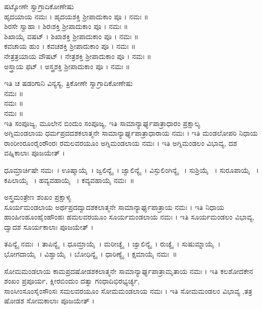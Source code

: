ಷಟ್ಕೋಣೇ ಸ್ವಾಗ್ರಾದಿಕೋಣೇಷು\\
 ಹೃದಯಾಯ ನಮಃ । ಹೃದಯಶಕ್ತಿ ಶ್ರೀಪಾದುಕಾಂ ಪೂ । ನಮಃ ॥\\
 ಶಿರಸೇ ಸ್ವಾಹಾ । ಶಿರಃಶಕ್ತಿ ಶ್ರೀಪಾದುಕಾಂ ಪೂ । ನಮಃ ॥\\
 ಶಿಖಾಯೈ ವಷಟ್ । ಶಿಖಾಶಕ್ತಿ ಶ್ರೀಪಾದುಕಾಂ ಪೂ । ನಮಃ ॥\\
 ಕವಚಾಯ ಹುಂ । ಕವಚಶಕ್ತಿ ಶ್ರೀಪಾದುಕಾಂ ಪೂ । ನಮಃ ॥\\
 ನೇತ್ರತ್ರಯಾಯ ವೌಷಟ್ । ನೇತ್ರಶಕ್ತಿ ಶ್ರೀಪಾದುಕಾಂ ಪೂ । ನಮಃ ॥\\
 ಅಸ್ತ್ರಾಯ ಫಟ್ । ಅಸ್ತ್ರಶಕ್ತಿ ಶ್ರೀಪಾದುಕಾಂ ಪೂ । ನಮಃ ॥

ಇತಿ ಚ ಷಡಂಗಾನಿ ವಿನ್ಯಸ್ಯ, ತ್ರಿಕೋಣೇ ಸ್ವಾಗ್ರಾದಿಕೋಣೇಷು\\
 ನಮಃ ॥\\
 ನಮಃ ॥\\
 ನಮಃ ॥\\
ಇತಿ ಸಂಪೂಜ್ಯ, ಮೂಲೇನ ಬಿಂದುಂ ಸಂಪೂಜ್ಯ,  ಇತಿ ಸಾಮಾನ್ಯಾರ್ಘ್ಯಪಾತ್ರಾಧಾರಂ ಪ್ರಕ್ಷಾಲ್ಯ\\
 ಅಗ್ನಿಮಂಡಲಾಯ ಧರ್ಮಪ್ರದದಶಕಲಾತ್ಮನೇ ಸಾಮಾನ್ಯಾರ್ಘ್ಯಪಾತ್ರಾಧಾರಾಯ ನಮಃ । ಇತಿ ಮಂಡಲೋಪರಿ ನಿಧಾಯ\\
 ರಾಂರೀಂರೂಂರೈಂರೌಂರಃ ರಮಲವರಯೂಂ ಅಗ್ನಿಮಂಡಲಾಯ ನಮಃ । ಇತಿ ಅಗ್ನಿಮಂಡಲಂ ವಿಭಾವ್ಯ, ದಶ ವಹ್ನಿಕಾಲಾಃ ಪೂಜಯೇತ್ ।

 ಧೂಮ್ರಾರ್ಚಿಷೇ   ನಮಃ~।  ಊಷ್ಮಾಯೈ~।  ಜ್ವಲಿನ್ಯೈ~।  ಜ್ವಾಲಿನ್ಯೈ~।  ವಿಸ್ಫುಲಿಂಗಿನ್ಯೈ ~।  ಸುಶ್ರಿಯೈ ~।  ಸುರೂಪಾಯೈ ~।  ಕಪಿಲಾಯೈ ~।  ಹವ್ಯವಹಾಯೈ ~।  ಕವ್ಯವಹಾಯೈ ನಮಃ~॥

ಅಸ್ತ್ರಮಂತ್ರೇಣ ಶಂಖಂ ಪ್ರಕ್ಷಾಳ್ಯ\\
 ಸೂರ್ಯಮಂಡಲಾಯ ಅರ್ಥಪ್ರದದ್ವಾದಶಕಲಾತ್ಮನೇ ಸಾಮಾನ್ಯಾರ್ಘ್ಯಪಾತ್ರಾಯ ನಮಃ । ಇತಿ ನಿಧಾಯ\\
 ಹಾಂಹೀಂಹೂಂಹೈಂಹೌಂಹಃ ಹಮಲವರಯೂಂ ಸೂರ್ಯಮಂಡಲಾಯ ನಮಃ । ಇತಿ ಸೂರ್ಯಮಂಡಲಂ ವಿಭಾವ್ಯ, ದ್ವಾದಶ ಸೂರ್ಯಕಾಲಾಃ ಪೂಜಯೇತ್ ।

 ತಪಿನ್ಯೈ ನಮಃ~।  ತಾಪಿನ್ಯೈ~।  ಧೂಮ್ರಾಯೈ~।  ಮರೀಚ್ಯೈ~।  ಜ್ವಾಲಿನ್ಯೈ~।  ರುಚ್ಯೈ~।  ಸುಷುಮ್ನಾಯೈ~।  ಭೋಗದಾಯೈ~।  ವಿಶ್ವಾಯೈ~।  ಬೋಧಿನ್ಯೈ~।  ಧಾರಿಣ್ಯೈ~।  ಕ್ಷಮಾಯೈ ನಮಃ~॥

 ಸೋಮಮಂಡಲಾಯ ಕಾಮಪ್ರದಷೋಡಶಕಲಾತ್ಮನೇ ಸಾಮಾನ್ಯಾರ್ಘ್ಯಪಾತ್ರಾಮೃತಾಯ ನಮಃ । ಇತಿ ಕಲಶೋದಕೇನ ಶಂಖಂ ಪ್ರಪೂರ್ಯ, ಕ್ಷೀರಬಿಂದುಂ ದತ್ವಾ  ಗಂಧಾದಿಭಿರಭ್ಯರ್ಚ್ಯ,\\
 ಸಾಂಸೀಂಸೂಂಸೈಂಸೌಂಸಃ ಸಮಲವರಯೂಂ ಸೋಮಮಂಡಲಾಯ ನಮಃ । ಇತಿ ಸೋಮಮಂಡಲಂ ವಿಭಾವ್ಯ ,ತತ್ರ ಷೋಡಶ ಸೋಮಕಾಲಾಃ ಪೂಜಯೇತ್ ।

